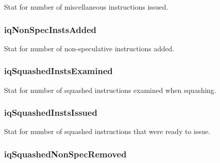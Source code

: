 \label{classInstQueue_ad234890bc414fffe7ed71840c51be5cb}
Stat for number of miscellaneous instructions issued. \hypertarget{classInstQueue_adf890a08fae50ea8249171b07c40adac}{
\subsubsection[{iqNonSpecInstsAdded}]{ {\bf iqNonSpecInstsAdded}}}
\label{classInstQueue_adf890a08fae50ea8249171b07c40adac}
Stat for number of non-\/speculative instructions added. \hypertarget{classInstQueue_a8312e8984bcfab5a77de40e1738103db}{
\subsubsection[{iqSquashedInstsExamined}]{ {\bf iqSquashedInstsExamined}}}
\label{classInstQueue_a8312e8984bcfab5a77de40e1738103db}
Stat for number of squashed instructions examined when squashing. \hypertarget{classInstQueue_ac91799c895e5aff3af0afdbd7691a163}{
\subsubsection[{iqSquashedInstsIssued}]{ {\bf iqSquashedInstsIssued}}}
\label{classInstQueue_ac91799c895e5aff3af0afdbd7691a163}
Stat for number of squashed instructions that were ready to issue. \hypertarget{classInstQueue_a6c0b47431b6e84536fd9bb61624d6d97}{
\subsubsection[{iqSquashedNonSpecRemoved}]{ {\bf iqSquashedNonSpecRemoved}}}
